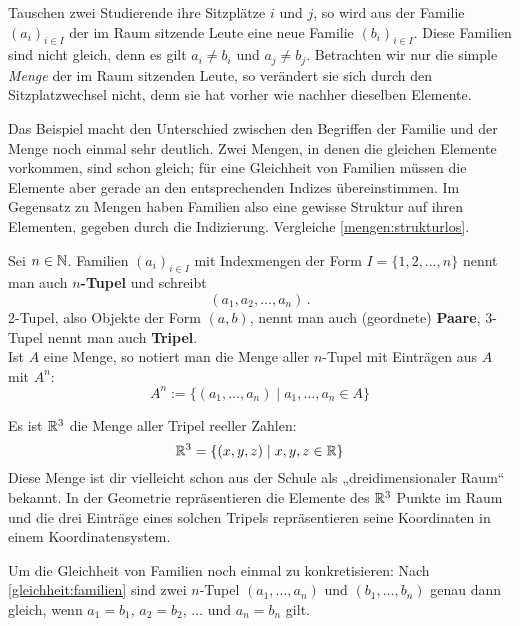 \begin{bsp}
	Tauschen zwei Studierende ihre Sitzplätze $i$ und $j$, so wird aus der Familie $(a_i)_{i\in I}$ der im Raum sitzende Leute eine neue Familie $(b_i)_{i\in I}$. Diese Familien sind nicht gleich, denn es gilt $a_i\neq b_i$ und $a_j\neq b_j$. Betrachten wir nur die simple \textit{Menge} der im Raum sitzenden Leute, so verändert sie sich durch den Sitzplatzwechsel nicht, denn sie hat vorher wie nachher dieselben Elemente. 
\end{bsp}

\begin{bem}
	Das Beispiel macht den Unterschied zwischen den Begriffen der Familie und der Menge noch einmal sehr deutlich. Zwei Mengen, in denen die gleichen Elemente vorkommen, sind schon gleich; für eine Gleichheit von Familien müssen die Elemente aber gerade an den entsprechenden Indizes übereinstimmen. Im Gegensatz zu Mengen haben Familien also eine gewisse Struktur auf ihren Elementen, gegeben durch die Indizierung. Vergleiche \cref{mengen:strukturlos}.
\end{bem}

\begin{de}[Tupel]
	Sei $n\in {\mathbb N}$. Familien $(a_i)_{i\in I}$ mit Indexmengen der Form $I=\{1,2,\dots,n\}$ nennt man auch \textbf{$n$-Tupel} und schreibt
		\[ (a_1,a_2,\dots,a_n) \,. \]
	2-Tupel, also Objekte der Form $(a,b)$, nennt man auch (geordnete) \textbf{Paare}, 3-Tupel nennt man auch \textbf{Tripel}. \\[0.5em]
	Ist $A$ eine Menge, so notiert man die Menge aller $n$-Tupel mit Einträgen aus $A$ mit $A^n$:
	\[ A^n := \{ (a_1,\dots , a_n) \mid a_1,\dots , a_n \in A \} \]
\end{de}


\begin{bsp}
 Es ist ${\mathbb R}^3$ die Menge aller Tripel reeller Zahlen:
 \[ {\mathbb R}^3 = \{(x,y,z) \mid x,y,z\in {\mathbb R} \} \]
 Diese Menge ist dir vielleicht schon aus der Schule als „dreidimensionaler Raum“ bekannt. In der Geometrie repräsentieren die Elemente des ${\mathbb R}^3$ Punkte im Raum und die drei Einträge eines solchen Tripels repräsentieren seine Koordinaten in einem Koordinatensystem.
\end{bsp}



\begin{bem}
	Um die Gleichheit von Familien noch einmal zu konkretisieren: Nach \cref{gleichheit:familien} sind zwei $n$-Tupel $(a_1,\dots,a_n)$ und $(b_1,\dots,b_n)$ genau dann gleich, wenn $a_1=b_1$, $a_2=b_2$, $\dots$ und $a_n=b_n$ gilt.
\end{bem}

